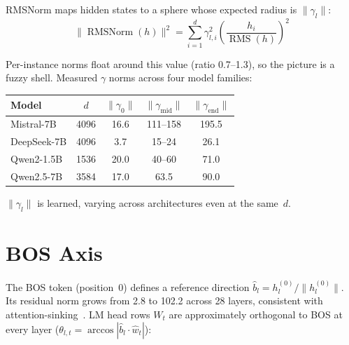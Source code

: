 \documentclass{article}
\begin{document}
RMSNorm maps hidden states to a sphere whose expected radius is $\|\gamma_l\|$:
\[
\|\operatorname{RMSNorm}(h)\|^2 = \sum_{i=1}^d \gamma_{l,i}^2 \left(\frac{h_i}{\operatorname{RMS}(h)}\right)^2
\]

Per-instance norms float around this value (ratio 0.7--1.3), so the picture is a
fuzzy shell. Measured $\gamma$ norms across four model families:

\begin{center}
\begin{tabular}{lcccc}
\toprule
Model & $d$ & $\|\gamma_0\|$ & $\|\gamma_{\mathrm{mid}}\|$ & $\|\gamma_{\mathrm{end}}\|$ \\
\midrule
Mistral-7B & 4096 & 16.6 & 111--158 & 195.5 \\
DeepSeek-7B & 4096 & 3.7 & 15--24 & 26.1 \\
Qwen2-1.5B & 1536 & 20.0 & 40--60 & 71.0 \\
Qwen2.5-7B & 3584 & 17.0 & 63.5 & 90.0 \\
\bottomrule
\end{tabular}
\end{center}

$\|\gamma_l\|$ is learned, varying across architectures even at the same~$d$.

\section{BOS Axis}

The BOS token (position~0) defines a reference direction $\hat{b}_l =
h_l^{(0)}/\|h_l^{(0)}\|$. Its residual norm grows from 2.8 to 102.2 across
28 layers, consistent with attention-sinking~\cite{xiao2023efficient}. LM head
rows $W_t$ are approximately orthogonal to BOS at every layer ($\theta_{l,t} =
\arccos|\hat{b}_l \cdot \hat{w}_t|$):
\end{document}
